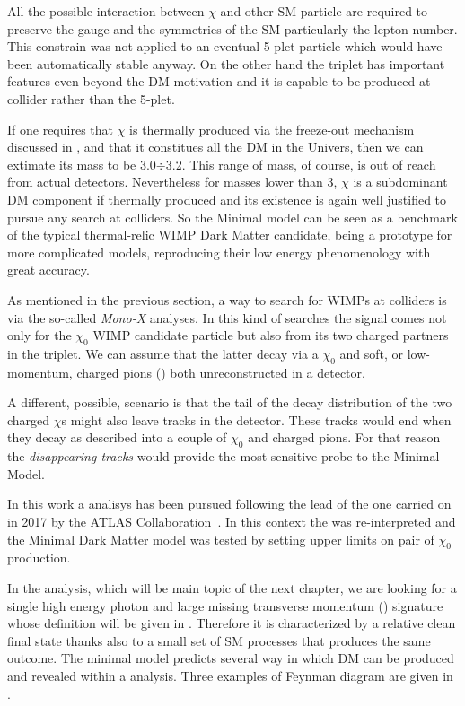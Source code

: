 All the possible interaction between $\chi$ and other SM particle are required to preserve the gauge and the symmetries of the SM particularly the lepton number. This constrain was not applied to an eventual 5-plet particle which would have been automatically stable anyway. On the other hand the triplet has important features even beyond the DM motivation and it is capable to be produced at collider rather than the 5-plet.

If one requires that $\chi$ is thermally produced via the freeze-out mechanism discussed in \Sect{\ref{sec:wimp}}, and that it constitues all the DM in the Univers, then we can extimate its mass to be \SI{3.0}{}$\div$\SI{3.2}{\tev}. This range of mass, of course, is out of reach from actual detectors. Nevertheless for masses lower than \SI{3}{\tev}, $\chi$ is a subdominant DM component if thermally produced and its existence is again well justified to pursue any search at colliders. So the Minimal model can be seen as a benchmark of the typical thermal-relic WIMP Dark Matter candidate, being a prototype for more complicated models, reproducing their low energy phenomenology with great accuracy.

As mentioned in the previous section, a way to search for WIMPs at colliders is via the so-called \emph{Mono-X} analyses. In this kind of searches the signal comes not only for the $\chi_0$ WIMP candidate particle but also from its two charged partners in the triplet. We can assume that the latter decay via a $\chi_0$ and soft, or low-momentum, charged pions (\pipm) both unreconstructed in a detector. 

A different, possible, scenario is that the tail of the decay distribution of the two charged $\chi$s might also leave tracks in the detector. These tracks would end when they decay as described into a couple of $\chi_0$ and charged pions. For that reason the \emph{disappearing tracks} would provide the most sensitive probe to the Minimal Model.

\smallskip
In this work a \mph analisys has been pursued following the lead of the one carried on in 2017 by the ATLAS Collaboration~\cite{paperMP}. In this context the \mph was re-interpreted and the Minimal Dark Matter model was tested by setting upper limits on pair of $\chi_0$ production.

In the \mph analysis, which will be main topic of the next chapter, we are looking for a single high energy photon and large missing transverse momentum (\met) signature whose definition will be given in \Sect{\ref{sec:recoreal}}. Therefore it is characterized by a relative clean final state thanks also to a small set of SM processes that produces the same outcome. The minimal model predicts several way in which DM can be produced and revealed within a \mph analysis. Three examples of Feynman diagram are given in \Fig{\ref{fig:feynman}}.

